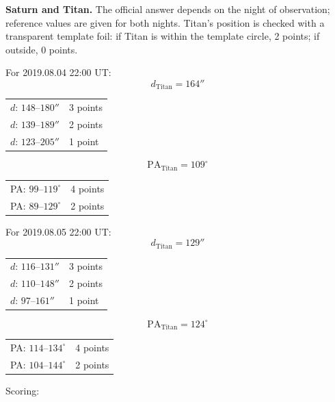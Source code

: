 \textbf{Saturn and Titan.} The official answer depends on the night of
observation; reference values are given for both nights. Titan's position is
checked with a transparent template foil: if Titan is within the template
circle, 2 points; if outside, 0 points.


\medskip
For 2019.08.04 22:00 UT:
\[ d_{\mathrm{Titan}} = 164'' \]
\begin{center}
\begin{tabular}{ll}
$d$: $148$--$180''$ & 3 points \\
$d$: $139$--$189''$ & 2 points \\
$d$: $123$--$205''$ & 1 point \\
\end{tabular}
\end{center}
\[ \mathrm{PA}_{\mathrm{Titan}} = 109^\circ \]
\begin{center}
\begin{tabular}{ll}
PA: $99$--$119^\circ$ & 4 points \\
PA: $89$--$129^\circ$ & 2 points \\
\end{tabular}
\end{center}

For 2019.08.05 22:00 UT:
\[ d_{\mathrm{Titan}} = 129'' \]
\begin{center}
\begin{tabular}{ll}
$d$: $116$--$131''$ & 3 points \\
$d$: $110$--$148''$ & 2 points \\
$d$: $97$--$161''$ & 1 point \\
\end{tabular}
\end{center}
\[ \mathrm{PA}_{\mathrm{Titan}} = 124^\circ \]
\begin{center}
\begin{tabular}{ll}
PA: $114$--$134^\circ$ & 4 points \\
PA: $104$--$144^\circ$ & 2 points \\
\end{tabular}
\end{center}

\medskip
Scoring:

